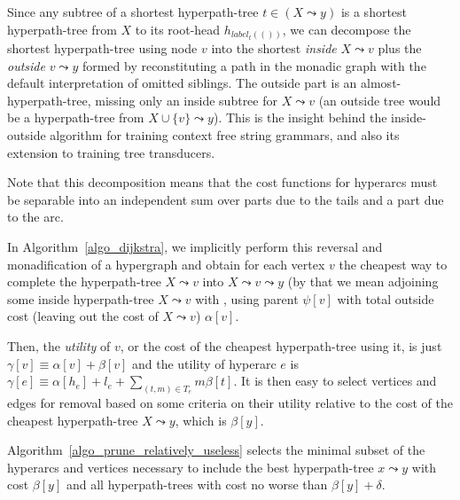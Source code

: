 \documentclass[english]{article}
\newcommand\inside{\beta}
\newcommand\outside{\alpha}
\newcommand\union{\cup}
\newcommand\algname[1]{\textbf{#1}}
\newcommand\algref[1]{Algorithm~\ref{#1}}
\begin{document}
  Since any subtree of a shortest hyperpath-tree $t\in{(X\leadsto y)}$ is a
  shortest hyperpath-tree from $X$ to its root-head $h_{label_{t}(())}$, we can
  decompose the shortest hyperpath-tree using node $v$ into the shortest
  \emph{inside} $X\leadsto v$ plus the \emph{outside} $v\leadsto y$ formed by
  reconstituting a path in the monadic graph with the default interpretation of
  omitted siblings.  The outside part is an almost-hyperpath-tree, missing only
  an inside subtree for $X\leadsto v$ (an outside tree would be a hyperpath-tree
  from $X\union \{v\} \leadsto y$).  This is the insight behind the
  inside-outside algorithm\cite{InsideOutside} for training context free string
  grammars, and also its extension to training tree transducers\cite{TTT}.

  Note that this decomposition means that the cost functions for hyperarcs must
  be separable into an independent sum over parts due to the tails and a part
  due to the arc.

  In \algref{algo_dijkstra}, we implicitly perform this reversal and
  monadification of a hypergraph and obtain for each vertex $v$ the cheapest way
  to complete the hyperpath-tree $X\leadsto v$ into $X\leadsto v\leadsto y$ (by
  that we mean adjoining some inside hyperpath-tree $X\leadsto v$ with , using
  parent $\psi[v]$ with total outside cost (leaving out the cost of $X\leadsto
  v$) $\outside[v]$.

  Then, the \emph{utility} of $v$, or the cost of the
  cheapest hyperpath-tree using it, is just $\gamma[v]\equiv
  \outside[v]+\inside[v]$ and the utility of hyperarc $e$ is $\gamma[e]\equiv
  \outside[h_e]+l_e+\sum_{(t,m)\in T_e}m\inside[t]$.  It is then easy to select
  vertices and edges for removal based on some criteria on their utility
  relative to the cost of the cheapest hyperpath-tree $X\leadsto y$, which is
  $\inside[y]$.

  \algref{algo_prune_relatively_useless} selects the minimal
  subset of the hyperarcs and vertices necessary to include the best
  hyperpath-tree $x\leadsto y$ with cost $\inside[y]$ and all hyperpath-trees
  with cost no worse than $\inside[y]+\delta$.

\newcommand\holdout[3]{{\algname{COSTEXCEPT_{#1}({#2},{#3})}}}
\end{document}
